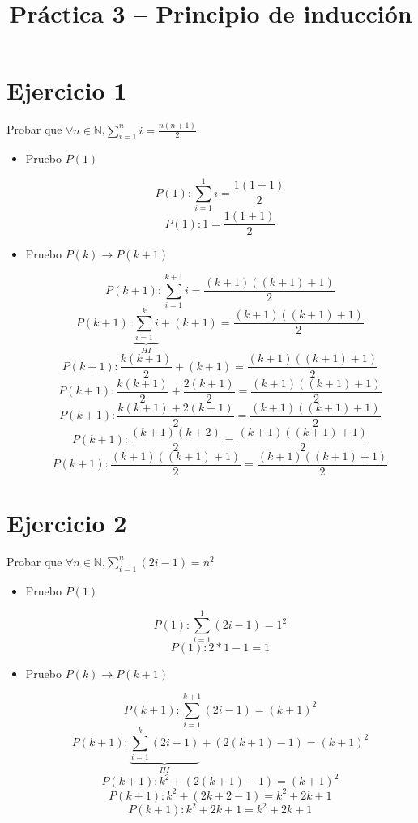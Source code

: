 \documentclass[10pt,a4paper]{article}
\title{Práctica 3 – Principio de inducción}
\date{}
\begin{document}
\maketitle

\section*{Ejercicio 1}
Probar que $\forall n \in \mathbb{N}$,$\sum^{n}_{i=1}i= \frac{n(n+1)}{2}$
\begin{itemize}
\item Pruebo $P(1)$

$$P(1):\sum^{1}_{i=1}i=\frac{1(1+1)}{2}$$
$$P(1): 1 = \frac{1(1+1)}{2}$$

\item Pruebo $P(k)\rightarrow P(k+1)$

$$P(k+1):\sum^{k+1}_{i=1}i= \frac{(k+1)((k+1)+1)}{2}$$
$$P(k+1):\underbrace{\sum^{k}_{i=1}i}_{HI}+ (k+1)= \frac{(k+1)((k+1)+1)}{2}$$
$$P(k+1): \frac{k(k+1)}{2}  + (k+1)= \frac{(k+1)((k+1)+1)}{2}$$
$$P(k+1): \frac{k(k+1)}{2}  +  \frac{2(k+1)}{2}= \frac{(k+1)((k+1)+1)}{2}$$
$$P(k+1): \frac{k(k+1)+2(k+1)}{2}= \frac{(k+1)((k+1)+1)}{2}$$
$$P(k+1): \frac{(k+1)(k+2)}{2}= \frac{(k+1)((k+1)+1)}{2}$$
$$P(k+1): \frac{(k+1)((k+1)+1)}{2}= \frac{(k+1)((k+1)+1)}{2}$$

\end{itemize}

\section*{Ejercicio 2}
Probar que $\forall n \in \mathbb{N}$,$\sum^{n}_{i=1}(2i-1)=n^{2}$

\begin{itemize}
\item Pruebo $P(1)$

$$P(1):\sum^{1}_{i=1}(2i-1)=1^{2}$$
$$P(1):2*1-1=1$$

\item Pruebo $P(k)\rightarrow P(k+1)$

$$P(k+1):\sum^{k+1}_{i=1}(2i-1)=(k+1)^{2}$$
$$P(k+1):\underbrace{\sum^{k}_{i=1}(2i-1)}_{HI}+ (2(k+1)-1)=(k+1)^{2}$$
$$P(k+1):    k^{2}   + (2(k+1)-1)=(k+1)^{2}$$
$$P(k+1):    k^{2}   + (2k+2-1)=k^{2}+2k+1$$
$$P(k+1):    k^{2}  + 2k +1=k^{2}+2k+1$$

\end{itemize}
\end{document}
